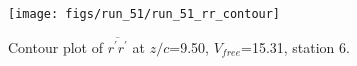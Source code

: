 \begin{figure}[H]
\centering
\texttt{[image: figs/run\_51/run\_51\_rr\_contour]}
\caption{Contour plot of $\overline{r^\prime r^\prime}$ at $z/c$=9.50, $V_{free}$=15.31, station 6.}
\end{figure}


